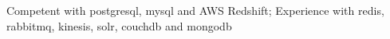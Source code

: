 \item Competent with postgresql, mysql and AWS Redshift; Experience with redis, rabbitmq, kinesis, solr, couchdb and mongodb
